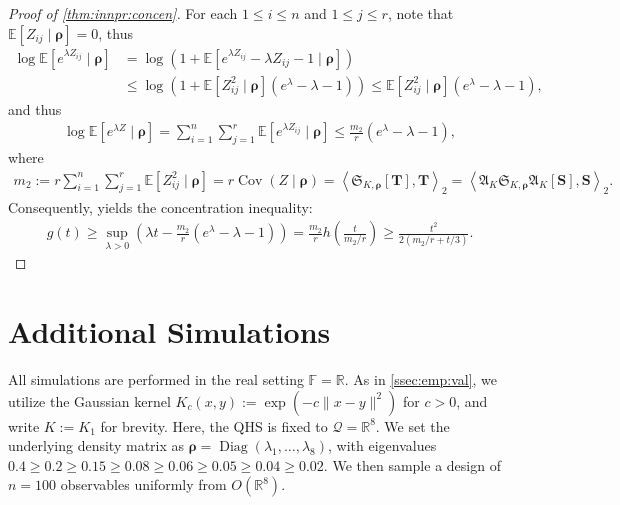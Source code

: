 \documentclass[noinfoline]{imsart}\setcounter{tocdepth}{2}
\renewcommand{\b}[1]{\mathbb{#1}} %
\newcommand{\m}[1]{\mathbf{#1}} %
\newcommand{\f}[1]{\mathfrak{#1}} %
\renewcommand{\c}[1]{\mathcal{#1}} %
\newcommand{\mb}[1]{\boldsymbol{#1}} %
\newcommand{\innpr}[2]{{\left\langle {#1},{#2}\right\rangle}} %
\newcommand{\Diag}{\operatorname{Diag}}
\newcommand{\Cov}{\operatorname{Cov}}
\theoremstyle{plain}
\begin{document}
\begin{appendix}
\begin{proof}[Proof of \cref{thm:innpr:concen}]
For each $1 \le i \le n$ and $1 \le j \le r$, note that $\b{E}[Z_{ij} \mid \mb{\rho}]= 0$, thus
\begin{align*}
    \log \b{E}\left[ e^{\lambda Z_{ij}} \mid \mb{\rho} \right] &= \log \left( 1 + \b{E}\left[ e^{\lambda Z_{ij}} - \lambda Z_{ij} - 1 \mid \mb{\rho} \right] \right) \\
    &\le \log \left( 1 + \b{E}[Z_{ij}^{2} \mid \mb{\rho}] \left( e^{\lambda} - \lambda - 1\right) \right) \le \b{E}[Z_{ij}^{2} \mid \mb{\rho}] \left( e^{\lambda} - \lambda - 1\right),
\end{align*}
and thus
\begin{align*}
    \log \b{E} \left[ e^{\lambda Z} \mid \mb{\rho} \right] = \sum_{i=1}^{n} \sum_{j=1}^{r} \b{E}\left[ e^{\lambda Z_{ij}} \mid \mb{\rho} \right] 
    \le \frac{m_{2}}{r} \left( e^{\lambda} - \lambda - 1\right),
\end{align*}
where
\begin{align*}
    m_{2} := r \sum_{i=1}^{n} \sum_{j=1}^{r} \b{E}[Z_{ij}^{2} \mid \mb{\rho}] = r\Cov(Z \mid \mb{\rho}) = \innpr{\f{S}_{K, \mb{\rho}} [\m{T}]}{\m{T}}_{2} = \innpr{\f{A}_{K} \f{S}_{K, \mb{\rho}} \f{A}_{K} [\m{S}]}{\m{S}}_{2}.
\end{align*}
Consequently, \cite[(2.10)]{boucheron2003concentration} yields the concentration inequality:
\begin{align*}
    g(t) \ge \sup_{\lambda > 0} \left( \lambda t - \frac{m_{2}}{r}(e^{\lambda} - \lambda - 1) \right) = \frac{m_{2}}{r} h \left( \frac{t}{m_{2}/r} \right) \ge \frac{t^{2}}{2(m_{2}/r + t/3)}.
\end{align*}
\end{proof}

\section{Additional Simulations}\label{sec:supp_material_simulation_study}
All simulations are performed in the real setting $\b{F}=\b{R}$.
As in \cref{ssec:emp:val}, we utilize the Gaussian kernel $K_{c}(x,y) := \exp (-c \|x-y\|^{2})$ for $c>0$, and write $K:=K_{1}$ for brevity. Here, the QHS is fixed to $\c{Q}=\b{R}^{8}$. We set the underlying density matrix as 
$\mb{\rho} = \Diag (\lambda_{1}, \dots, \lambda_{8})$, with eigenvalues 
$0.4 \geq 0.2 \geq 0.15 \geq 0.08 \geq 0.06 \geq 0.05 \geq 0.04 \geq 0.02$. We then sample a design of $n=100$ observables uniformly from $O(\b{R}^{8})$. 


\end{appendix}
\end{document}
